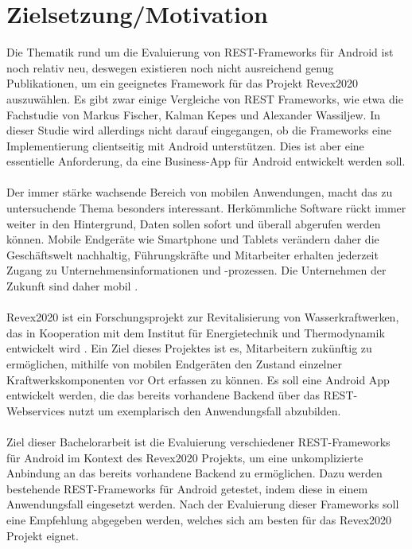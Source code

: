 \documentclass[a4paper,11pt,german,public]{INSOexpose}
\begin{document}

\section{Zielsetzung/Motivation}

Die Thematik rund um die Evaluierung von REST-Frameworks für Android ist noch relativ neu, deswegen existieren noch nicht ausreichend genug Publikationen, um ein geeignetes Framework für das Projekt Revex2020 auszuwählen. Es gibt zwar einige Vergleiche von REST Frameworks, wie etwa die Fachstudie von Markus Fischer, Kalman Kepes und Alexander Wassiljew\cite{vergleich13}. In dieser Studie wird allerdings nicht darauf eingegangen, ob die Frameworks eine Implementierung clientseitig mit Android unterstützen. Dies ist aber eine essentielle Anforderung, da eine Business-App für Android entwickelt werden soll. 
\\\\
Der immer stärke wachsende Bereich von mobilen Anwendungen, macht das zu untersuchende Thema besonders interessant. Herkömmliche Software rückt immer weiter in den Hintergrund, Daten sollen sofort und überall abgerufen werden können. Mobile Endgeräte wie Smartphone und Tablets verändern daher die Geschäftswelt nachhaltig, Führungskräfte und Mitarbeiter erhalten jederzeit Zugang zu Unternehmensinformationen und -prozessen. Die Unternehmen der Zukunft sind daher mobil \cite{smartMobileApps7}.  
\\\\
Revex2020 ist ein Forschungsprojekt zur Revitalisierung von Wasserkraftwerken, das in Kooperation mit dem Institut für Energietechnik und Thermodynamik entwickelt wird \cite{projektbeschreibung:revex2020}. Ein Ziel dieses Projektes ist es, Mitarbeitern zukünftig zu ermöglichen, mithilfe von mobilen Endgeräten den Zustand einzelner Kraftwerkskomponenten vor Ort erfassen zu können. Es soll eine Android App entwickelt werden, die das bereits vorhandene Backend über das REST-Webservices nutzt um exemplarisch den Anwendungsfall abzubilden.
\\\\
Ziel dieser Bachelorarbeit ist die Evaluierung verschiedener REST-Frameworks für Android im Kontext des Revex2020 Projekts, um eine unkomplizierte Anbindung an das bereits vorhandene Backend zu ermöglichen. Dazu werden bestehende REST-Frameworks für Android getestet, indem diese in einem Anwendungsfall eingesetzt werden. Nach der Evaluierung dieser Frameworks soll eine Empfehlung abgegeben werden, welches sich am besten für das Revex2020 Projekt eignet.
\newpage
\end{document}
